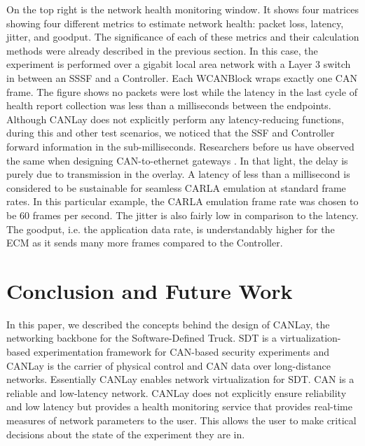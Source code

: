 \documentclass[letterpaper,twocolumn,12pt]{article}
\begin{document}
On the top right is the network health monitoring window. It shows four matrices showing
four different metrics to estimate network health: packet loss, latency, jitter, and goodput. The significance of each of these metrics and their calculation methods were already described in the previous section. In this case, the experiment is performed over a gigabit local area network with a Layer 3 switch in between an SSSF and a Controller. Each WCANBlock wraps exactly one CAN frame. The figure shows no packets were lost while the latency in the last cycle of health report collection was less than a milliseconds between the endpoints. 
Although CANLay does not explicitly perform any latency-reducing functions, during this and other test scenarios, we noticed that the SSF and Controller forward information in the sub-milliseconds. Researchers before us have observed the same when designing CAN-to-ethernet gateways \cite{florian_polzlbauer_experience_2019}. In that light, the delay is purely due to transmission in the overlay. 
A latency of less than a millisecond is considered to be sustainable for seamless CARLA emulation at standard frame rates. 
In this particular example, the CARLA emulation frame rate was chosen to be 60 frames per second. The jitter is also fairly low in comparison to the latency. The goodput, i.e. the application data rate, is understandably higher for the ECM as it sends many more frames compared to the Controller. 


\section{Conclusion and Future Work}
In this paper, we described the concepts behind the design of CANLay, the networking backbone for the Software-Defined Truck. 
SDT is a virtualization-based experimentation framework for CAN-based security experiments and CANLay is the carrier of physical control and CAN data over long-distance networks. Essentially CANLay enables network virtualization for SDT. CAN is a reliable and low-latency network. CANLay does not explicitly ensure reliability and low latency but provides a health monitoring service that provides real-time measures of network parameters to the user. This allows the user to make critical decisions about the state of the experiment they are in.
\end{document}
